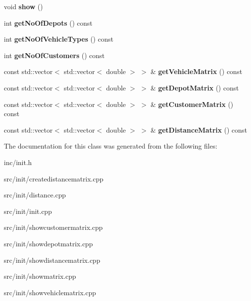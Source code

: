 \begin{DoxyCompactItemize}
\mbox{\label{class_init_a9f8816aee25eb57e9a8f133244fbffda}} 
void {\bfseries show} ()
\item 
\mbox{\label{class_init_ad6dd362eb2f7b5ac46af9666b7d920da}} 
int {\bfseries get\+No\+Of\+Depots} () const
\item 
\mbox{\label{class_init_a3589c9bb9d90429ca08c476163aa1b28}} 
int {\bfseries get\+No\+Of\+Vehicle\+Types} () const
\item 
\mbox{\label{class_init_aa734c4109c33931c0b038b622b867c18}} 
int {\bfseries get\+No\+Of\+Customers} () const
\item 
\mbox{\label{class_init_a50e5ae9da26f66e57b81e1cfda053dcb}} 
const std\+::vector$<$ std\+::vector$<$ double $>$ $>$ \& {\bfseries get\+Vehicle\+Matrix} () const
\item 
\mbox{\label{class_init_a8bccc72be332623cdc21c36085787fda}} 
const std\+::vector$<$ std\+::vector$<$ double $>$ $>$ \& {\bfseries get\+Depot\+Matrix} () const
\item 
\mbox{\label{class_init_a571046054e4cc1f40bba8fc2e952c213}} 
const std\+::vector$<$ std\+::vector$<$ double $>$ $>$ \& {\bfseries get\+Customer\+Matrix} () const
\item 
\mbox{\label{class_init_a023ffffca04fa97b54a847cb02b5d0c1}} 
const std\+::vector$<$ std\+::vector$<$ double $>$ $>$ \& {\bfseries get\+Distance\+Matrix} () const
\end{DoxyCompactItemize}


The documentation for this class was generated from the following files\+:\begin{DoxyCompactItemize}
\item 
inc/init.\+h\item 
src/init/createdistancematrix.\+cpp\item 
src/init/distance.\+cpp\item 
src/init/init.\+cpp\item 
src/init/showcustomermatrix.\+cpp\item 
src/init/showdepotmatrix.\+cpp\item 
src/init/showdistancematrix.\+cpp\item 
src/init/showmatrix.\+cpp\item 
src/init/showvehiclematrix.\+cpp\end{DoxyCompactItemize}
